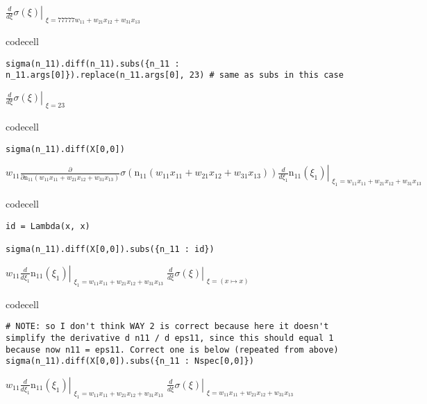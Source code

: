 $\displaystyle \left. \frac{d}{d \xi} \sigma{\left(\xi \right)} \right|_{\substack{ \xi=77777 w_{11} + w_{21} x_{12} + w_{31} x_{13} }}$

codecell

\begin{verbatim}
sigma(n_11).diff(n_11).subs({n_11 : n_11.args[0]}).replace(n_11.args[0], 23) # same as subs in this case
\end{verbatim}

$\displaystyle \left. \frac{d}{d \xi} \sigma{\left(\xi \right)} \right|_{\substack{ \xi=23 }}$

codecell

\begin{verbatim}
sigma(n_11).diff(X[0,0])
\end{verbatim}

$\displaystyle w_{11} \frac{\partial}{\partial \operatorname{n_{11}}{\left(w_{11} x_{11} + w_{21} x_{12} + w_{31} x_{13} \right)}} \sigma{\left(\operatorname{n_{11}}{\left(w_{11} x_{11} + w_{21} x_{12} + w_{31} x_{13} \right)} \right)} \left. \frac{d}{d \xi_{1}} \operatorname{n_{11}}{\left(\xi_{1} \right)} \right|_{\substack{ \xi_{1}=w_{11} x_{11} + w_{21} x_{12} + w_{31} x_{13} }}$

codecell

\begin{verbatim}
id = Lambda(x, x)

sigma(n_11).diff(X[0,0]).subs({n_11 : id})
\end{verbatim}

$\displaystyle w_{11} \left. \frac{d}{d \xi_{1}} \operatorname{n_{11}}{\left(\xi_{1} \right)} \right|_{\substack{ \xi_{1}=w_{11} x_{11} + w_{21} x_{12} + w_{31} x_{13} }} \left. \frac{d}{d \xi} \sigma{\left(\xi \right)} \right|_{\substack{ \xi=\left( x \mapsto x \right) }}$

codecell

\begin{verbatim}
# NOTE: so I don't think WAY 2 is correct because here it doesn't simplify the derivative d n11 / d eps11, since this should equal 1 because now n11 = eps11. Correct one is below (repeated from above)
sigma(n_11).diff(X[0,0]).subs({n_11 : Nspec[0,0]})
\end{verbatim}

$\displaystyle w_{11} \left. \frac{d}{d \xi_{1}} \operatorname{n_{11}}{\left(\xi_{1} \right)} \right|_{\substack{ \xi_{1}=w_{11} x_{11} + w_{21} x_{12} + w_{31} x_{13} }} \left. \frac{d}{d \xi} \sigma{\left(\xi \right)} \right|_{\substack{ \xi=w_{11} x_{11} + w_{21} x_{12} + w_{31} x_{13} }}$

